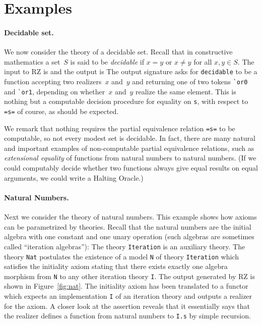 \section{Examples}
\label{sec:examples}

\paragraph{Decidable set.}
\label{sec:decidable-set}

We now consider the theory of a decidable set.
Recall that in constructive mathematics a set~$S$ is said to be
\emph{decidable} if $x = y$ or $x \neq y$ for all $x, y \in S$.
The input to RZ is
%
{\small{}}%
%
\noindent
and the output is
%
{\small{}}
%
\noindent
The output signature asks for \Verb|decidable| to be a function
accepting two realizers~$x$ and~$y$ and returning one of two tokens
\Verb|`or0| and \Verb|`or1|, depending on whether~$x$ and~$y$ realize
the same element. This is nothing but a computable decision procedure
for equality on \Verb|s|, with respect to \Verb|=s=| of course, as
should be expected.

We remark that nothing requires the partial equivalence relation
\Verb|=s=| to be computable, so not every modest set is decidable. In
fact, there are many natural and important examples of non-computable partial
equivalence relations, such as \emph{extensional equality} of functions
from natural numbers to natural numbers. (If we could computably
decide whether two functions always give equal results on equal
arguments, we could write a Halting Oracle.)

\paragraph{Natural Numbers.}
\label{sec:natural-numb}

Next we consider the theory of natural numbers. This example shows how
axioms can be parametrized by theories. Recall that the natural
numbers are the initial algebra with one constant and one unary
operation (such algebras are sometimes called ``iteration algebras''):
%
{\small{}}%
%
\noindent
The theory \Verb|Iteration| is an auxiliary theory. The theory
\Verb|Nat| postulates the existence of a model \Verb|N| of theory
\Verb|Iteration| which satisfies the initiality axiom stating that
there exists exactly one algebra morphism from \Verb|N| to any other
iteration theory \Verb|I|. The output generated by RZ is shown in
Figure~\ref{fig:nat}. The initiality axiom has been translated to a
functor which expects an implementation \Verb|I| of an iteration
theory and outputs a realizer for the axiom. A closer look at the
assertion reveals that it essentially says that the realizer defines a
function from natural numbers to \Verb|I.s| by simple recursion.

